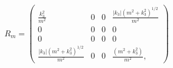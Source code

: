 \begin{equation}
R_{m}=\left(
\begin{array}{cccc}
\frac{k_{3}^{2}}{m^2}  & 0 & 0 &
\frac{\left| k_{3}\right| \left( m^{2}+k_{3}^{2}\right) ^{1/2}} {m^2}\\
0 & 0 & 0 & 0 \\
0 & 0 & 0 & 0 \\
\frac{\left| k_{3}\right| \left( m^{2}+k_{3}^{2}\right) ^{1/2}}{m^2} & 0 & 0 & \frac{\left( m^{2}+k_{3}^{2}\right)}{m^2},
\end{array}\right)
\end{equation}

